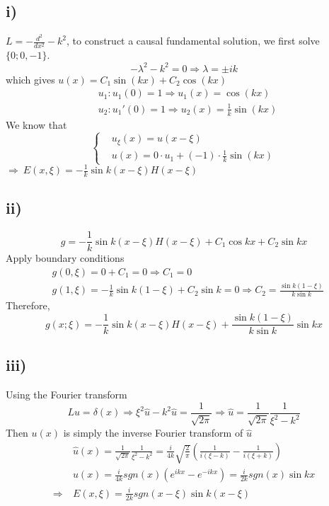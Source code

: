 \documentclass[a4paper, 11pt]{article}
\begin{document}
\begin{spacing}{1.5}
\subsection*{i)}
$L = -\frac{d^2}{dx^2} - k^2$, to construct a causal fundamental solution, we first solve $\{ 0;0,-1 \}$. \\
$$
-\lambda^2 - k^2 = 0 \Rightarrow \lambda = \pm i k
$$
which gives $u(x) = C_1 \sin(kx) + C_2 \cos(kx) $
\begin{align*}
& u_1: u_1(0) = 1 \Rightarrow u_1(x) = \cos(kx) \\
& u_2: u_1'(0) = 1 \Rightarrow u_2(x) = \frac{1}{k} \sin(kx) 
\end{align*}
We know that
$$
\left\{
\begin{aligned}
& u_\xi(x) = u(x-\xi) \\
& u(x) = 0 \cdot u_1 + (-1) \cdot \frac{1}{k} \sin(kx)
\end{aligned}
\right.
$$
$\Rightarrow \  E(x,\xi) = -\frac{1}{k} \sin k(x-\xi) H(x-\xi)$

\subsection*{ii)}
$$
g = -\frac{1}{k}  \sin k(x-\xi) H(x-\xi) + C_1\cos kx + C_2\sin kx
$$
Apply boundary conditions
\begin{align*}
& g(0,\xi) = 0+ C_1 = 0  \Rightarrow C_1=0\\
& g(1,\xi) = -\frac{1}{k} \sin k(1-\xi) + C_2\sin k = 0 \Rightarrow C_2 = \frac{\sin k(1-\xi)}{k \sin k}
\end{align*}
Therefore,
$$
g(x;\xi) = -\frac{1}{k}  \sin k(x-\xi) H(x-\xi) + \frac{\sin k(1-\xi)}{k \sin k} \sin kx
$$

\subsection*{iii)}
Using the Fourier transform 
$$
Lu = \delta(x) \Rightarrow \xi^2 \hat{u} - k^2 \hat{u} = \frac{1}{\sqrt{2\pi}} \Rightarrow \hat{u}=\frac{1}{\sqrt{2\pi}} \frac{1}{\xi^2 - k^2}
$$
Then $u(x)$ is simply the inverse Fourier transform of $\hat{u}$
\begin{align*}
& \hat{u}(x)  =\frac{1}{\sqrt{2\pi}} \frac{1}{\xi^2 - k^2} = \frac{i}{4k} \sqrt{\frac{2}{\pi}} \left( \frac{1}{i(\xi-k)} - \frac{1}{i(\xi+k)} \right) \\
& u(x) = \frac{i}{4k} sgn(x) \left( e^{ikx} -e^{-ikx} \right) = \frac{i}{2k} sgn(x) \sin kx \\
\Rightarrow \ & E(x,\xi) = \frac{i}{2k} sgn(x-\xi) \sin k(x-\xi)
\end{align*}



\end{spacing}
\end{document}
